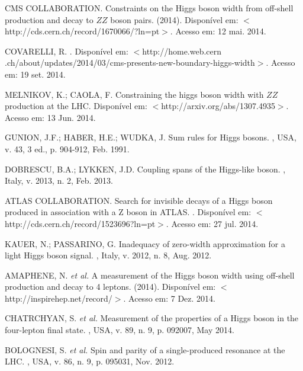 \begin{thebibliography}{}
CMS COLLABORATION.
\newblock Constraints on the Higgs boson width from off-shell production and decay to $ZZ$ boson pairs. 
 (2014). Disponível em: $<$http://cds.cern.ch/record/1670066/?ln=pt$>$. Acesso em: 12 mai. 2014.

COVARELLI, R.
. Disponível em: $<$http://home.web.cern .ch/about/updates/2014/03/cms-presents-new-boundary-higgs-width$>$. Acesso em: 19 set. 2014.

MELNIKOV, K.; CAOLA, F.
\newblock Constraining the higgs boson width with $ZZ$ production at the LHC. Disponível em: $<$http://arxiv.org/abs/1307.4935$>$. Acesso em: 13 Jun. 2014.

GUNION, J.F.; HABER, H.E.; WUDKA, J.
\newblock Sum rules for Higgs bosons.
, USA, v. 43, 3 ed., p. 904-912, Feb. 1991.

DOBRESCU, B.A.; LYKKEN, J.D.
\newblock Coupling spans of the Higgs-like boson.
, Italy, v. 2013, n. 2, Feb. 2013.

ATLAS COLLABORATION.
\newblock Search for invisible decays of a Higgs boson produced in association with a Z boson in ATLAS.
. Disponível em: $<$http://cds.cern.ch/record/1523696?ln=pt$>$. Acesso em: 27 jul. 2014.

KAUER, N.; PASSARINO, G.
\newblock Inadequacy of zero-width approximation for a light Higgs boson signal.
, Italy, v. 2012, n. 8, Aug. 2012.


AMAPHENE, N. \textit{et al.}
\newblock A measurement of the Higgs boson width using off-shell production and decay to 4 leptons.
 (2014). Disponível em: $<$http://inspirehep.net/record/$>$. Acesso em: 7 Dez. 2014.

CHATRCHYAN, S. \textit{et al.}
\newblock Measurement of the properties of a Higgs boson in the four-lepton final state.
, USA, v. 89, n. 9, p. 092007, May 2014.

BOLOGNESI, S. \textit{et al.}
\newblock Spin and parity of a single-produced resonance at the LHC.
, USA, v. 86, n. 9, p. 095031, Nov. 2012.


\end{thebibliography}
